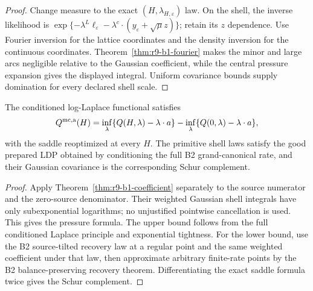 \begin{proof}
Change measure to the exact $(H,\lambda_{H,\varepsilon})$ law.  On the shell,
the inverse likelihood is
$\exp\{-\lambda^L\ell_\varepsilon-
\lambda^c\cdot(y_\varepsilon+\sqrt\mu z)\}$; retain its $z$ dependence.
Use Fourier inversion for the lattice coordinates and the density inversion
for the continuous coordinates.  Theorem~\ref{thm:r9-b1-fourier} makes the
minor and large arcs negligible relative to the Gaussian coefficient, while
the central pressure expansion gives the displayed integral.  Uniform
covariance bounds supply domination for every declared shell scale.
\end{proof}

\begin{theorem}
\label{thm:r9-b1-main}
The conditioned log-Laplace functional satisfies
\[
 Q^{\rm mc,a}(H)
 =\inf_\lambda\{Q(H,\lambda)-\lambda\cdot a\}
  -\inf_\lambda\{Q(0,\lambda)-\lambda\cdot a\},
\]
with the saddle reoptimized at every $H$.  The primitive shell laws satisfy
the good prepared LDP obtained by conditioning the full B2 grand-canonical
rate, and their Gaussian covariance is the corresponding Schur complement.
\end{theorem}

\begin{proof}
Apply Theorem~\ref{thm:r9-b1-coefficient} separately to the source numerator
and the zero-source denominator.  Their weighted Gaussian shell integrals
have only subexponential logarithms; no unjustified pointwise cancellation is
used.  This gives the pressure formula.  The upper bound follows from the full
conditioned Laplace principle and exponential tightness.  For the lower bound,
use the B2 source-tilted recovery law at a regular point and the same weighted
coefficient under that law, then approximate arbitrary finite-rate points by
the B2 balance-preserving recovery theorem.  Differentiating the exact saddle
formula twice gives the Schur complement.
\end{proof}
